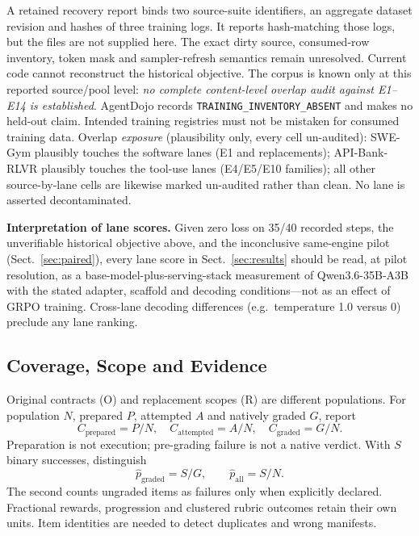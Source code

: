\documentclass[a4paper,runningheads]{llncs}
\begin{document}
A retained recovery report binds two source-suite identifiers, an aggregate
dataset revision and hashes of three training logs. It reports hash-matching
those logs, but the files are not supplied here. The exact dirty source,
consumed-row inventory, token mask and sampler-refresh semantics remain
unresolved. Current code cannot reconstruct the historical objective.
The corpus is known only at this reported source/pool level: \emph{no complete
content-level overlap audit against E1--E14 is established}. AgentDojo records
\texttt{TRAINING\_INVENTORY\_ABSENT} and makes no held-out claim. Intended
training registries must not be mistaken for consumed training data.
Overlap \emph{exposure} (plausibility only, every cell un-audited):
SWE-Gym plausibly touches the software lanes (E1 and replacements);
API-Bank-RLVR plausibly touches the tool-use lanes (E4/E5/E10 families);
all other source-by-lane cells are likewise marked un-audited rather than
clean. No lane is asserted decontaminated.

\textbf{Interpretation of lane scores.} Given zero loss on 35/40 recorded
steps, the unverifiable historical objective above, and the inconclusive
same-engine pilot (Sect.~\ref{sec:paired}), every lane score in
Sect.~\ref{sec:results} should be read, at pilot resolution, as a
base-model-plus-serving-stack measurement of Qwen3.6-35B-A3B with the stated
adapter, scaffold and decoding conditions---not as an effect of GRPO
training. Cross-lane decoding differences (e.g.\ temperature 1.0 versus 0)
preclude any lane ranking.

\subsection{Coverage, Scope and Evidence}
Original contracts (O) and replacement scopes (R) are different populations.
For population $N$, prepared $P$, attempted $A$ and natively graded $G$, report
\begin{equation}
C_{\mathrm{prepared}}=P/N,\quad C_{\mathrm{attempted}}=A/N,\quad
C_{\mathrm{graded}}=G/N.
\end{equation}
Preparation is not execution; pre-grading failure is not a native verdict.
With $S$ binary successes, distinguish
\begin{equation}
\widehat p_{\mathrm{graded}}=S/G,\qquad \widehat p_{\mathrm{all}}=S/N.
\end{equation}
The second counts ungraded items as failures only when explicitly declared.
Fractional rewards, progression and clustered rubric outcomes retain their own
units. Item identities are needed to detect duplicates and wrong manifests.
\end{document}
